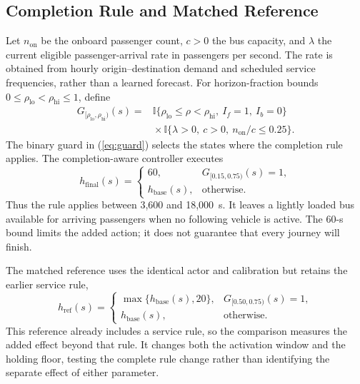 \documentclass[letterpaper,journal]{IEEEtran}
\newcommand{\ind}{\mathbb{I}}
\newcommand{\hbase}{h_{\mathrm{base}}}
\newcommand{\hfinal}{h_{\mathrm{final}}}
\newcommand{\hrefctrl}{h_{\mathrm{ref}}}
\begin{document}
\subsection{Completion Rule and Matched Reference}
Let \(n_{\mathrm{on}}\) be the onboard passenger count, \(c>0\) the bus capacity, and \(\lambda\) the current eligible passenger-arrival rate in passengers per second. The rate is obtained from hourly origin--destination demand and scheduled service frequencies, rather than a learned forecast. For horizon-fraction bounds \(0\leq\rho_{\mathrm{lo}}<\rho_{\mathrm{hi}}\leq1\), define
\begin{equation}
\begin{split}
 G_{[\rho_{\mathrm{lo}},\rho_{\mathrm{hi}})}(s)={}&
 \ind\{\rho_{\mathrm{lo}}\leq\rho<\rho_{\mathrm{hi}},\ I_f=1,\ I_b=0\}\\
 &{}\times\ind\{\lambda>0,\ c>0,\ n_{\mathrm{on}}/c\leq0.25\}.
\end{split}
 \label{eq:guard}
\end{equation}
The binary guard in (\ref{eq:guard}) selects the states where the completion rule applies. The completion-aware controller executes
\begin{equation}
 \hfinal(s)=
 \begin{cases}
 60,&G_{[0.15,0.75)}(s)=1,\\
 \hbase(s),&\text{otherwise}.
 \end{cases}
 \label{eq:final}
\end{equation}
Thus the rule applies between 3,600 and 18,000~s. It leaves a lightly loaded bus available for arriving passengers when no following vehicle is active. The 60-s bound limits the added action; it does not guarantee that every journey will finish.

The matched reference uses the identical actor and calibration but retains the earlier service rule,
\begin{equation}
 \hrefctrl(s)=
 \begin{cases}
 \max\{\hbase(s),20\},&G_{[0.50,0.75)}(s)=1,\\
 \hbase(s),&\text{otherwise}.
 \end{cases}
 \label{eq:reference}
\end{equation}
This reference already includes a service rule, so the comparison measures the added effect beyond that rule. It changes both the activation window and the holding floor, testing the complete rule change rather than identifying the separate effect of either parameter.
\end{document}
